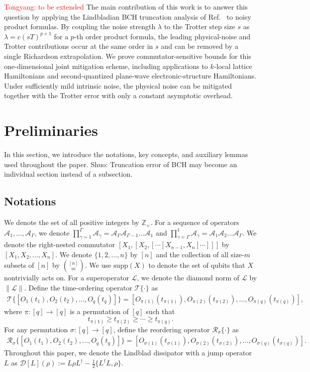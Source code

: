 \documentclass[11pt]{article}
\newcommand{\A}{\mathcal{A}}
\newcommand{\supp}{\mathrm{supp}}
\newcommand{\mc}{\mathcal}
\newcommand{\mb}{\mathbb}
\newcommand{\sz}[1]{{\color{blue} Shuo: #1}}
\begin{document}
\textcolor{red}{Tongyang: to be extended}
The main contribution of this work is to answer this question by applying the Lindbladian BCH truncation analysis of Ref.~\cite{wang2026lindbladiansimulationcommutatorbounds} to noisy product formulas. By coupling the noise strength $\lambda$ to the Trotter step size $s$ as $\lambda = c(sT)^{p+1}$ for a $p$-th order product formula, the leading physical-noise and Trotter contributions occur at the same order in $s$ and can be removed by a single Richardson extrapolation. We prove commutator-sensitive bounds for this one-dimensional joint mitigation scheme, including applications to $k$-local lattice Hamiltonians and second-quantized plane-wave electronic-structure Hamiltonians. Under sufficiently mild intrinsic noise, the physical noise can be mitigated together with the Trotter error with only a constant asymptotic overhead.


\section{Preliminaries}
 In this section, we introduce the notations, key concepts, and auxiliary lemmas used throughout the paper. \sz{Truncation error of BCH may become an individual section instead of a subsection.}


\subsection{Notations}
We denote the set of all positive integers by $\mb{Z}_+$. For a sequence of operators $\A_1, \ldots, \A_{\Gamma}$, we denote $\prod_{\gamma=1}^\Gamma \A_{\gamma}= \A_{\Gamma}\A_{\Gamma-1} \ldots \A_1$ and $\prod_{\gamma=\Gamma}^1 \A_{\gamma}= \A_{1}\A_{2} \ldots \A_\Gamma$. We denote the right-nested commutator $[X_1, [X_2, [\cdots[X_{n-1}, X_n]\cdots]]]$ by $[X_1, X_2, \ldots, X_n]$. We denote $\{1, 2, \ldots, n\}$ by $[n]$ and the collection of all size-$m$ subsets of $[n]$ by $\binom{[n]}{m}$. We use $\supp(X)$ to denote the set of qubits that $X$ nontrivially acts on.  For a superoperator $\mc L$, we denote the diamond norm of $\mc L$ by $\|\mc L\|$.
Define the time-ordering operator $\mc T\{\cdot\}$ as \begin{align*}
    \mc T\big\{[O_1(t_1),O_2(t_2),\ldots, O_q(t_q) ]\big\} = [O_{\pi(1)}(t_{\pi(1)}),O_{\pi(2)}(t_{\pi(2)}),\ldots, O_{\pi(q)}(t_{\pi(q)})],
\end{align*}
where $\pi\colon [q]\to[q]$ is a permutation of $[q]$ such that \[
    t_{\pi(1)}\ge t_{\pi(2)}\ge \cdots \ge t_{\pi(q)}.
    \]
For any permutation $\sigma\colon [q]\to [q]$, define the reordering operator $\mc R_{\sigma}\{\cdot\}$ as \begin{align*}
    \mc R_{\sigma}\big\{[O_1(t_1),O_2(t_2),\ldots, O_q(t_q)]\big\} = [O_{\sigma(1)}(t_{\sigma(1)}),O_{\sigma(2)}(t_{\sigma(2)}),\ldots, O_{\sigma(q)}(t_{\sigma(q)})].
\end{align*}
Throughout this paper, we denote the Lindblad dissipator with a jump operator $L$ as $\mathcal{D}[L](\rho):= L\rho L^\dagger - \frac{1}{2}\{L^\dagger L, \rho\}$.
\end{document}
